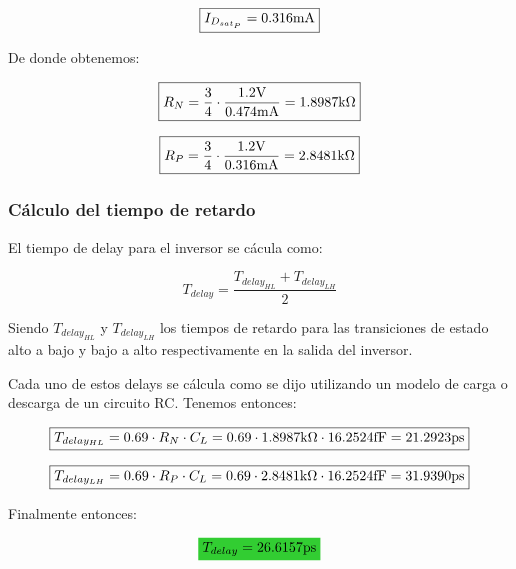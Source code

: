 \begin{equation*}
\boxed{ I_{D_{sat_{P}}} = 0.316 \si[per-mode=symbol]{\milli\ampere} }
\end{equation*}


De donde obtenemos:

\begin{equation*}
\boxed{ R_{N} = \frac{3}{4} \cdot \frac{1.2 \si[per-mode=symbol]{\volt} }{0.474 \si[per-mode=symbol]{\milli\ampere}} = 1.8987 \si[per-mode=symbol]{\kilo\ohm} }
\end{equation*}


\begin{equation*}
\boxed{ R_{P} = \frac{3}{4} \cdot \frac{1.2 \si[per-mode=symbol]{\volt} }{0.316 \si[per-mode=symbol]{\milli\ampere}} = 2.8481 \si[per-mode=symbol]{\kilo\ohm} }
\end{equation*}



\subsubsection{Cálculo del tiempo de retardo}


El tiempo de delay para el inversor se cácula como:

\begin{equation}
T_{delay} = \frac{T_{delay_{HL}} + T_{delay_{LH}}}{2}
\end{equation}


Siendo $T_{delay_{HL}}$ y $T_{delay_{LH}}$ los tiempos de retardo para las transiciones de estado alto a bajo y bajo a alto respectivamente en la salida del inversor.


Cada uno de estos delays se cálcula como se dijo utilizando un modelo de carga o descarga de un circuito RC. Tenemos entonces:


\begin{equation*}
\boxed{ T_{delay_{HL}} = 0.69 \cdot R_{N} \cdot C_{L} = 0.69 \cdot 1.8987 \si[per-mode=symbol]{\kilo\ohm} \cdot 16.2524 \si[per-mode=symbol]{\femto\farad} = 21.2923 \si[per-mode=symbol]{\pico\second} }
\end{equation*}


\begin{equation*}
\boxed{ T_{delay_{LH}} = 0.69 \cdot R_{P} \cdot C_{L} = 0.69 \cdot 2.8481 \si[per-mode=symbol]{\kilo\ohm} \cdot 16.2524 \si[per-mode=symbol]{\femto\farad} = 31.9390 \si[per-mode=symbol]{\pico\second} }
\end{equation*}


Finalmente entonces:


\label{calculated_val}
\begin{equation*}
\mathcolorbox{EQColor}{ T_{delay} = 26.6157 \si[per-mode=symbol]{\pico\second} }
\end{equation*}


